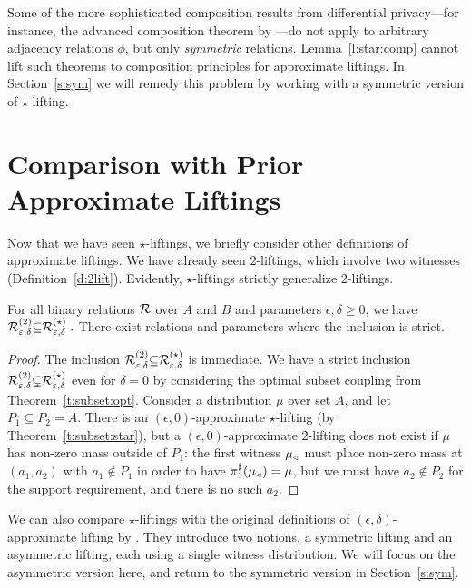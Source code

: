 \documentclass{lmcs}
\begin{document}
Some of the more sophisticated composition results from differential
privacy---for instance, the advanced composition theorem by \citet{DRV10}---do
not apply to arbitrary adjacency relations $\phi$, but only \emph{symmetric}
relations. Lemma~\ref{l:star:comp} cannot lift such theorems to composition
principles for approximate liftings. In Section~\ref{s:sym} we will remedy this
problem by working with a symmetric version of $\star$-lifting.

\section{Comparison with Prior Approximate Liftings} \label{s:comp}
Now that we have seen $\star$-liftings, we briefly consider other definitions of
approximate liftings. We have already seen $2$-liftings, which involve two
witnesses (Definition~\ref{d:2lift}). Evidently, $\star$-liftings strictly
generalize $2$-liftings.

\begin{thm} \label{l:incl:star}
  For all binary relations $\mathrel{\mathcal{R}}$ over $A$ and $B$ and parameters
  $\epsilon, \delta \geq 0$, we have
  $
    \mathrel{\mathrel{\mathcal{R}}^{(2)}_{\varepsilon, \delta}} \subseteq \mathrel{\mathrel{\mathcal{R}}^{(\star)}_{\varepsilon, \delta}} .
  $
  There exist relations and parameters where the inclusion is strict.
\end{thm}

\begin{proof}
  The inclusion $\mathrel{\mathrel{\mathcal{R}}^{(2)}_{\varepsilon, \delta}} \subseteq
  \mathrel{\mathrel{\mathcal{R}}^{(\star)}_{\varepsilon, \delta}}$ is immediate.  We have a strict inclusion
  $\mathrel{\mathrel{\mathcal{R}}^{(2)}_{\varepsilon, \delta}} \subsetneq \mathrel{\mathrel{\mathcal{R}}^{(\star)}_{ \varepsilon,
    \delta}}$ even for $\delta = 0$ by considering the optimal subset coupling
  from Theorem~\ref{t:subset:opt}. Consider a distribution $\mu$ over set $A$,
  and let $P_1 \subseteq P_2 = A$.  There is an $(\epsilon, 0)$-approximate
  $\star$-lifting (by Theorem~\ref{t:subset:star}), but a $(\epsilon,
  0)$-approximate $2$-lifting does not exist if $\mu$ has non-zero mass outside
  of $P_1$: the first witness $\mu_{\mspace{-1.5mu}{\scriptscriptstyle \vartriangleleft}}$ must place non-zero mass at
  $(a_1,a_2)$ with $a_1 \notin P_1$ in order to have $\pi_{1}^{\sharp}(\mu_{\mspace{-1.5mu}{\scriptscriptstyle \vartriangleleft}}) = \mu$,
  but we must have $a_2 \notin P_2$ for the support requirement, and there is no
  such $a_2$.
\end{proof}

We can also compare $\star$-liftings with the original definitions of
$(\epsilon,\delta)$-approximate lifting by \citet{BartheKOZ13}. They introduce
two notions, a symmetric lifting and an asymmetric lifting, each using a single
witness distribution. We will focus on the asymmetric version here, and return
to the symmetric version in Section~\ref{s:sym}.
\end{document}
